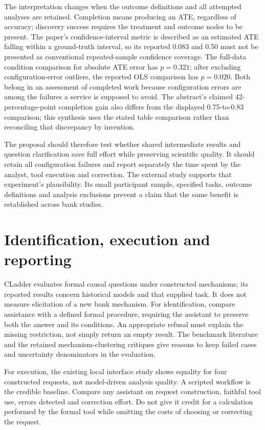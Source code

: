 The interpretation changes when the outcome definitions and all attempted
analyses are retained. Completion means producing an ATE, regardless of
accuracy; discovery success requires the treatment and outcome nodes to be
present. The paper's confidence-interval metric is described as an estimated
ATE falling within a ground-truth interval, so its reported 0.083 and 0.50
must not be presented as conventional repeated-sample confidence coverage.
The full-data condition comparison for absolute ATE error has $p=0.321$;
after excluding configuration-error outliers, the reported OLS comparison
has $p=0.020$. Both belong in an assessment of completed work because
configuration errors are among the failures a service is supposed to avoid.
The abstract's claimed 42-percentage-point completion gain also differs
from the displayed 0.75-to-0.83 comparison; this synthesis uses the stated
table comparison rather than reconciling that discrepancy by invention.
\citep[pp.~1, 5, 17--18]{exec13_census_orca}

The proposal should therefore test whether shared intermediate results and
question clarification save full effort while preserving scientific quality.
It should retain all configuration failures and report separately the time
spent by the analyst, tool execution and correction. The external study
supports that experiment's plausibility. Its small participant sample,
specified tasks, outcome definitions and analysis exclusions prevent a
claim that the same benefit is established across bank studies.

\section{Identification, execution and reporting}
CLadder evaluates formal causal questions under constructed mechanisms;
its reported results concern historical models and that supplied task.
It does not measure elicitation of a new bank mechanism.
\citep{v12_la_2312_04350}
For identification, compare assistance with a defined formal procedure,
requiring the assistant to preserve both the answer and its conditions.
An appropriate refusal must explain the missing restriction, not simply
return an empty result. The benchmark literature and the retained
mechanism-clustering critiques give reasons to keep failed cases and
uncertainty denominators in the evaluation.

For execution, the existing local interface study shows equality for four
constructed requests, not model-driven analysis quality. A scripted
workflow is the credible baseline. Compare any assistant on request
construction, faithful tool use, errors detected and correction effort.
Do not give it credit for a calculation performed by the formal tool
while omitting the costs of choosing or correcting the request.

